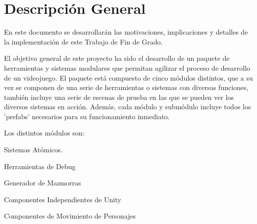\section{Descripción General}
En este documento se desarrollarán las motivaciones, implicaciones y detalles de la implementación de este Trabajo de Fin de Grado.

El objetivo general de este proyecto ha sido el desarrollo de un paquete de herramientas y sistemas modulares que permitan agilizar el proceso de desarrollo de un videojuego. 
El paquete está compuesto de cinco módulos distintos, que a su vez se componen de una serie de herramientas o sistemas con diversas funciones, también incluye una serie de 
escenas de prueba en las que se pueden ver los diversos sistemas en acción. Además, cada módulo y submódulo incluye todos los 'prefabs' necesarios para su funcionamiento 
inmediato. 

Los distintos módulos son: 
\begin{compactitem}
  \item Sistemas Atómicos.   
  \item Herramientas de Debug
  \item Generador de Mazmorras
  \item Componentes Independientes de Unity
  \item Componentes de Movimiento de Personajes
\end{compactitem} 

